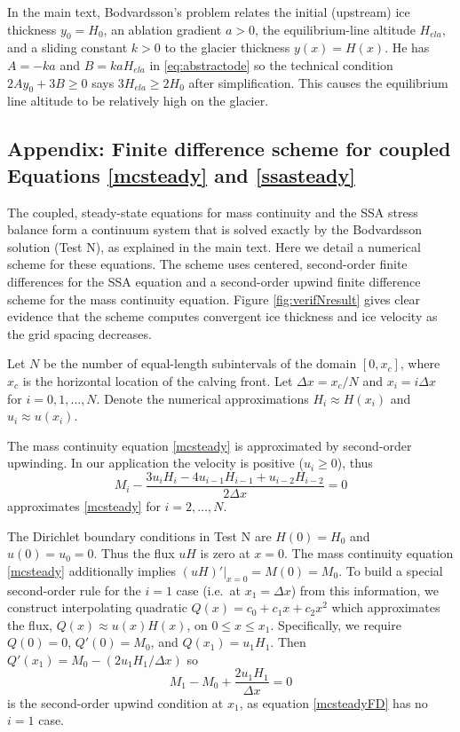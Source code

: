 \documentclass[twocolumn,letterpaper]{igs}
\begin{document}
In the main text, Bodvardsson's problem relates the initial (upstream) ice thickness $y_0=H_0$, an ablation gradient $a>0$, the equilibrium-line altitude $H_{ela}$, and a sliding constant $k>0$ to the glacier thickness $y(x) = H(x)$.  He has $A=-ka$ and $B=k a H_{ela}$ in \eqref{eq:abstractode} so the technical condition $2A y_0 + 3 B \ge 0$ says $3 H_{ela} \ge 2 H_0$ after simplification.  This causes the equilibrium line altitude to be relatively high on the glacier.


\subsection{Appendix: Finite difference scheme for coupled Equations \eqref{mcsteady} and \eqref{ssasteady}}  The coupled, steady-state equations for mass continuity and the SSA stress balance form a continuum system that is solved exactly by the Bodvardsson solution (Test N), as explained in the main text.  Here we detail a numerical scheme for these equations.  The scheme uses centered, second-order finite differences for the SSA equation and a second-order upwind finite difference scheme for the mass continuity equation.  Figure \ref{fig:verifNresult} gives clear evidence that the scheme computes convergent ice thickness and ice velocity as the grid spacing decreases.

Let $N$ be the number of equal-length subintervals of the domain $[0,x_c]$, where $x_c$ is the horizontal location of the calving front.  Let $\Delta x = x_c/N$ and $x_i = i \Delta x$ for $i=0,1,\dots,N$.  %
Denote the numerical approximations $H_i\approx H(x_i)$ and $u_i \approx u(x_i)$.

The mass continuity equation \eqref{mcsteady} is approximated by second-order upwinding.  In our application the velocity is positive ($u_i\ge 0$), thus
\begin{equation}
M_i - \frac{3 u_i H_i - 4 u_{i-1} H_{i-1} + u_{i-2} H_{i-2}}{2 \Delta x} = 0 \label{mcsteadyFD}
\end{equation}
approximates \eqref{mcsteady} for $i=2,\dots,N$.

The Dirichlet boundary conditions in Test N are $H(0)=H_0$ and $u(0)=u_0=0$.  Thus the flux $uH$ is zero at $x=0$.  The mass continuity equation \eqref{mcsteady} additionally implies $(uH)'\big|_{x=0}=M(0)=M_0$.  To build a special second-order rule for the $i=1$ case (i.e.~at $x_1 = \Delta x$) from this information, we construct interpolating quadratic $Q(x) = c_0 + c_1 x + c_2 x^2$ which approximates the flux, $Q(x) \approx u(x)H(x)$, on $0 \le x \le x_1$.  Specifically, we require $Q(0)=0$, $Q'(0)=M_0$, and $Q(x_1) = u_1 H_1$.  Then $Q'(x_1) = M_0 - (2 u_1 H_1/  \Delta x)$ so
\begin{equation}
M_1 - M_0 + \frac{2 u_1 H_1}{\Delta x} = 0 \label{mcbcFD}
\end{equation}
is the second-order upwind condition at $x_1$, as equation \eqref{mcsteadyFD} has no $i=1$ case.
\end{document}
